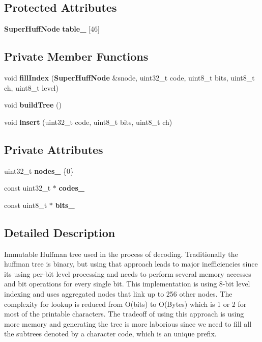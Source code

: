 \subsection*{Protected Attributes}
\begin{DoxyCompactItemize}
\item 
{\bf Super\+Huff\+Node} {\bf table\+\_\+} [46]
\end{DoxyCompactItemize}
\subsection*{Private Member Functions}
\begin{DoxyCompactItemize}
\item 
void {\bf fill\+Index} ({\bf Super\+Huff\+Node} \&snode, uint32\+\_\+t code, uint8\+\_\+t bits, uint8\+\_\+t ch, uint8\+\_\+t level)
\item 
void {\bf build\+Tree} ()
\item 
void {\bf insert} (uint32\+\_\+t code, uint8\+\_\+t bits, uint8\+\_\+t ch)
\end{DoxyCompactItemize}
\subsection*{Private Attributes}
\begin{DoxyCompactItemize}
\item 
uint32\+\_\+t {\bf nodes\+\_\+} \{0\}
\item 
const uint32\+\_\+t $\ast$ {\bf codes\+\_\+}
\item 
const uint8\+\_\+t $\ast$ {\bf bits\+\_\+}
\end{DoxyCompactItemize}


\subsection{Detailed Description}
Immutable Huffman tree used in the process of decoding. Traditionally the huffman tree is binary, but using that approach leads to major inefficiencies since it\textquotesingle{}s using per-\/bit level processing and needs to perform several memory accesses and bit operations for every single bit. This implementation is using 8-\/bit level indexing and uses aggregated nodes that link up to 256 other nodes. The complexity for lookup is reduced from O(bits) to O(\+Bytes) which is 1 or 2 for most of the printable characters. The tradeoff of using this approach is using more memory and generating the tree is more laborious since we need to fill all the subtrees denoted by a character code, which is an unique prefix.

